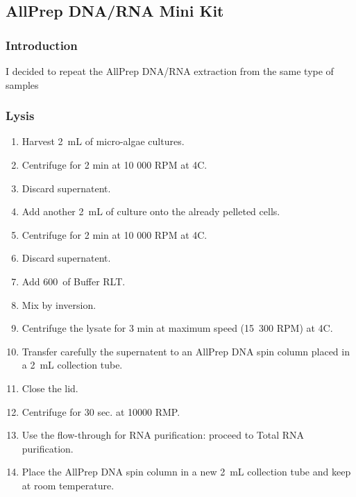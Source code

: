 \subsection{AllPrep DNA/RNA Mini Kit}
\label{task:20180213_cj0}

\subsubsection{Introduction}

I decided to repeat the AllPrep DNA/RNA extraction from the same type of samples

\subsubsection{Lysis}

\begin{enumerate}
\item Harvest 2~mL of micro-algae cultures.
\item Centrifuge for 2 min at 10 000 RPM at 4\degree C.
\item Discard supernatent.
\item Add another 2~mL of culture onto the already pelleted cells.
\item Centrifuge for 2 min at 10 000 RPM at 4\degree C.
\item Discard supernatent.
\item Add 600~\uL of Buffer RLT.
\item Mix by inversion.
\item Centrifuge the lysate for 3 min at maximum speed (15~300 RPM) at 4\degree C.
\item Transfer carefully the supernatent to an AllPrep DNA spin column placed in a 2~mL collection tube.
\item Close the lid.
\item Centrifuge for 30 sec. at 10000 RMP.
\item Use the flow-through for RNA purification: proceed to Total RNA purification.
\item Place the AllPrep DNA spin column in a new 2~mL collection tube and keep at room temperature.
\end{enumerate}

